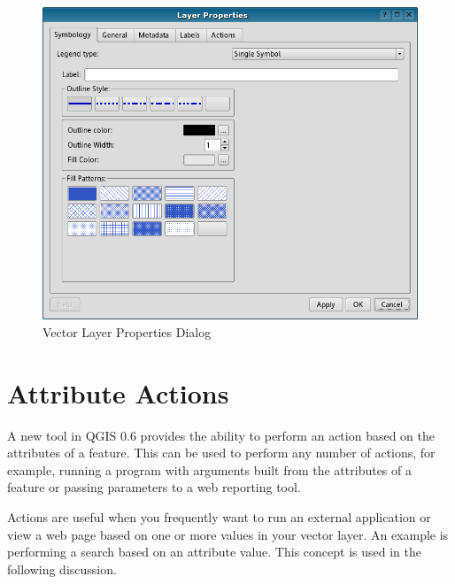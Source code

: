 \begin{figure}[h]
   \begin{center}
   \caption{Vector Layer Properties Dialog}\label{fig:vector_symbology}\smallskip
   \includegraphics[scale=.5]{qgis_user_guide_images/vectorLayerSymbology}  
\end{center}  
\end{figure}
\section{Attribute Actions}
A new tool in QGIS 0.6 provides the ability to perform an action based on the
attributes of a feature. This can be used to perform any number of actions, for
example, running a program with arguments built from the attributes of a
feature or passing parameters to a web reporting tool.

Actions are useful when you frequently want to run an external application or
view a web page based on one or more values in your vector layer. An example is
performing a search based on an attribute value. This concept is used in the
following discussion.

